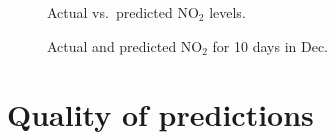 \begin{figure}[h]
\centering
{}
\caption{Actual vs.\ predicted NO$_2$ levels. }
\label{fig:correlations}
\end{figure}

\begin{figure}[h]
\centering
{}
\caption{Actual and predicted NO$_2$ for 10 days in Dec.}
\label{fig:predictions}
\end{figure}

\clearpage
\section{Quality of predictions}

